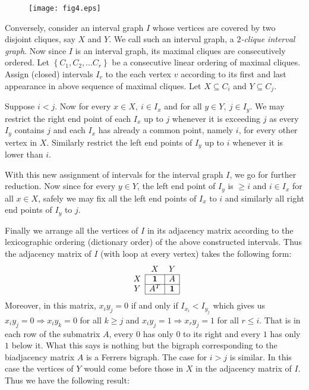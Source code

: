 \documentclass[11pt]{article}
\theoremstyle{definition}
\theoremstyle{remark}
\numberwithin{equation}{section}
\newcommand{\set}[1]{\left\{#1\right\}}
\begin{document}
\begin{figure}[h]
\begin{center}
\texttt{[image: fig4.eps]}
\end{center}
\end{figure}

Conversely, consider an interval graph $I$ whose vertices are covered by two disjoint cliques, say $X$ and $Y$. We call such an interval graph, a {\em $2$-clique interval graph}. Now since $I$ is an interval graph, its maximal cliques are consecutively ordered. Let $\set{C_1,C_2,\ldots C_r}$ be a consecutive linear ordering of maximal cliques. Assign (closed) intervals $I_v$ to the each vertex $v$ according to its first and last appearance in above sequence of maximal cliques. Let $X\subseteq C_i$ and $Y\subseteq C_j$. 

\vspace{1em} Suppose $i<j$. Now for every $x\in X,\ i\in I_x$ and for all $y\in Y,\ j\in I_y$. We may restrict the right end point of each $I_x$ up to $j$ whenever it is exceeding $j$ as every $I_y$ contains $j$ and each $I_x$ has already a common point, namely $i$, for every other vertex in $X$. Similarly restrict the left end points of $I_y$ up to $i$ whenever it is lower than $i$. 

\vspace{1em} With this new assignment of intervals for the interval graph $I$, we go for further reduction. Now since for every $y\in Y$, the left end point of $I_y$ is $\geqslant i$ and $i\in I_x$ for all $x\in X$, safely we may fix all the left end points of $I_x$ to $i$ and similarly all right end points of $I_y$ to $j$.

\vspace{1em} Finally we arrange all the vertices of $I$ in its adjacency matrix according to the lexicographic ordering (dictionary order) of the above constructed intervals. Thus the adjacency matrix of $I$ (with loop at every vertex) takes the following form:
$$\begin{array}{c|cc}
\multicolumn{1}{c}{} & X & Y \\ \cline{2-3} 
X & \multicolumn{1}{c|}{\mathbf{1}} & \multicolumn{1}{c|}{A} \\ \cline{2-3} 
Y & \multicolumn{1}{c|}{A^T} & \multicolumn{1}{c|}{\mathbf{1}} \\ \cline{2-3}
\end{array}$$
Moreover, in this matrix, $x_i y_j=0$ if and only if $I_{x_i}<I_{y_j}$ which gives us $x_i y_j=0\Longrightarrow x_i y_k=0$ for all $k\geqslant j$ and $x_i y_j=1\Longrightarrow x_r y_j=1$ for all $r\leqslant i$. That is in each row of the submatrix $A$, every $0$ has only $0$ to its right and every $1$ has only $1$ below it. What this says is nothing but the bigraph corresponding to the biadjacency matrix $A$ is a Ferrers bigraph. The case for $i>j$ is similar. In this case the vertices of $Y$ would come before those in $X$ in the adjacency matrix of $I$. Thus we have the following result:
\end{document}
